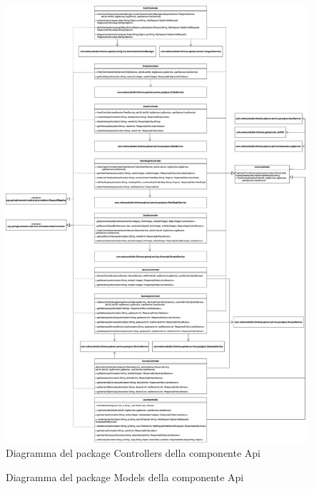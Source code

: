 		\begin{figure}[H]
			\centering
			\includegraphics[scale=0.295]{res/images/API/Controllers.png}
			\caption{Diagramma del package Controllers della componente Api}
			\label{Diagramma 13}
		\end{figure}
		\begin{figure}[H]
			\centering
			\caption{Diagramma del package Models della componente Api}
			\label{Diagramma 14}
		\end{figure}
